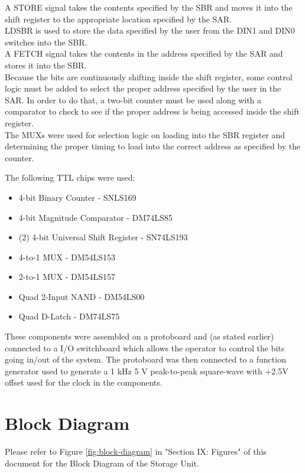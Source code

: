 \documentclass[journal, twocolumn, final,11pt,letterpaper]{IEEEtran}
\begin{document}
A STORE signal takes the contents specified by the SBR and moves it into the shift register to the appropriate location specified by the SAR.\\

LDSBR is used to store the data specified by the user from the DIN1 and DIN0 switches into the SBR. \\ 

A FETCH signal takes the contents in the address specified by the SAR and stores it into the SBR. \\

Because the bits are continuously shifting inside the shift register, some control logic must be added to select the proper address specified by the user in the SAR. In order to do that, a two-bit counter must be used along with a comparator to check to see if the proper address is being accessed inside the shift register. \\

The MUXs were used for selection logic on loading into the SBR register and determining the proper timing to load into the correct address as specified by the counter.

The following TTL chips were used:
\begin{itemize}
	\item 4-bit Binary Counter - SNLS169
	\item 4-bit Magnitude Comparator - DM74LS85
	\item (2) 4-bit Universal Shift Register - SN74LS193
	\item 4-to-1 MUX - DM54LS153	
	\item 2-to-1 MUX - DM54LS157
	\item Quad 2-Input NAND - DM54LS00
	\item Quad D-Latch - DM74LS75 \\
\end{itemize} 

These components were assembled on a protoboard and (as stated earlier) connected to a I/O switchboard which allows the operator to control the bits going in/out of the system. The protoboard was then connected to a function generator used to generate a 1 kHz 5 V peak-to-peak square-wave with +2.5V offset used for the clock in the components. \\


\section{Block Diagram}
Please refer to Figure \ref{fig:block-diagram} in "Section IX: Figures" of this document for the Block Diagram of the Storage Unit.  
\end{document}
